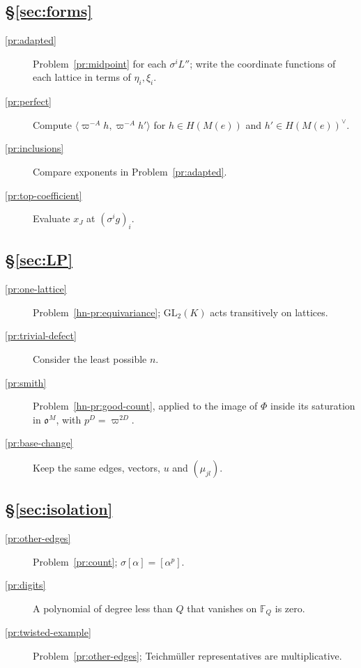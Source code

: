\documentclass[reqno]{amsart}
\theoremstyle{definition}
\theoremstyle{plain}
\theoremstyle{remark}
\newcommand{\F}{\mathbb F}
\newcommand{\GL}{\mathrm{GL}}
\newcommand{\vo}{\mathfrak o}
\begin{document}
\subsection*{\S\ref{sec:forms}}
\begin{description}
\item[\ref{pr:adapted}] Problem~\ref{pr:midpoint} for each \(\sigma^iL''\); write the coordinate functions of each lattice in terms of \(\eta_i,\xi_i\).
\item[\ref{pr:perfect}] Compute \(\langle\varpi^{-A}h,\varpi^{-A}h'\rangle\) for \(h\in H(M(e))\) and \(h'\in H(M(e))^\vee\).
\item[\ref{pr:inclusions}] Compare exponents in Problem~\ref{pr:adapted}.
\item[\ref{pr:top-coefficient}] Evaluate \(x_J\) at \((\sigma^ig)_i\).
\end{description}

\subsection*{\S\ref{sec:LP}}
\begin{description}
\item[\ref{pr:one-lattice}] Problem~\ref{hn-pr:equivariance}; \(\GL_2(K)\) acts transitively on lattices.
\item[\ref{pr:trivial-defect}] Consider the least possible \(n\).
\item[\ref{pr:smith}] Problem~\ref{hn-pr:good-count}, applied to the image of \(\Phi\) inside its saturation in \(\vo^M\), with \(p^D=\varpi^{2D}\).
\item[\ref{pr:base-change}] Keep the same edges, vectors, \(u\) and \((\mu_{jl})\).
\end{description}

\subsection*{\S\ref{sec:isolation}}
\begin{description}
\item[\ref{pr:other-edges}] Problem~\ref{pr:count}; \(\sigma[\alpha]=[\alpha^p]\).
\item[\ref{pr:digits}] A polynomial of degree less than \(Q\) that vanishes on \(\F_Q\) is zero.
\item[\ref{pr:twisted-example}] Problem~\ref{pr:other-edges}; Teichm\"uller representatives are multiplicative.
\end{description}
\end{document}
